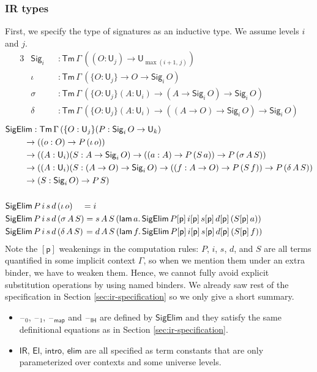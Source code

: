 \documentclass[acmsmall,screen,review,anonymous]{acmart}
\newcommand{\msf}[1]{{\mathsf{#1}}}
\newcommand{\p}{\mathsf{p}}
\newcommand{\U}{\msf{U}}
\newcommand{\El}{\msf{El}}
\newcommand{\Sig}{\msf{Sig}}
\newcommand{\blank}{{\mathord{\hspace{1pt}\text{--}\hspace{1pt}}}}
\newcommand{\IR}{\msf{IR}}
\newcommand{\intro}{\msf{intro}}
\newcommand{\IH}{\msf{IH}}
\newcommand{\map}{\msf{map}}
\newcommand{\elim}{\msf{elim}}
\newcommand{\Tm}{\msf{Tm}}
\newcommand{\lam}{\msf{lam}}
\newcommand{\SigElim}{\msf{SigElim}}
\begin{document}
\subsubsection{IR types} First, we specify the type of signatures as an inductive type. We assume levels $i$
and $j$.
\begin{alignat*}{3}
  &\Sig_i  &&: \Tm\,\Gamma\,((O : \U_j) \to \U_{\max(i+1,\,j)})\\
  &\iota   &&: \Tm\,\Gamma\,(\{O : \U_j\} \to O \to \Sig_i\,O)\\
  &\sigma  &&: \Tm\,\Gamma\,(\{O : \U_j\}(A : \U_i) \to (A \to \Sig_i\,O) \to \Sig_i\,O)\\
  &\delta  &&: \Tm\,\Gamma\,(\{O : \U_j\}(A : \U_i) \to ((A \to O) \to \Sig_i\,O) \to \Sig_i\,O)
\end{alignat*}
\begin{alignat*}{3}
  &\SigElim : \Tm\,\Gamma\,(\{O : \U_j\}(P : \Sig_i\,O \to \U_k)\\
  &           \hspace{2.2em}\to ((o : O) \to P\,(\iota\,o))\\
  &           \hspace{2.2em}\to ((A : \U_i)(S : A \to \Sig_i\,O) \to ((a : A) \to P\,(S\,a)) \to P\,(\sigma\,A\,S))\\
  &           \hspace{2.2em}\to ((A : \U_i)(S : (A \to O) \to \Sig_i\,O) \to ((f : A \to O) \to P\,(S\,f)) \to P\,(\delta\,A\,S))\\
  &           \hspace{2.2em}\to (S : \Sig_i\,O) \to P\,S)\\
  &\\
  &\SigElim\,P\,i\,s\,d\,(\iota\,o) \hspace{1.1em} = i\\
  &\SigElim\,P\,i\,s\,d\,(\sigma\,A\,S) = s\,A\,S\,(\lam\,a.\,\SigElim\,P[\p]\,i[\p]\,s[\p]\,d[\p]\,(S[\p]\,a))\\
  &\SigElim\,P\,i\,s\,d\,(\delta\,A\,S) \hspace{0.1em}= d\,A\,S\,(\lam\,f.\,\SigElim\,P[\p]\,i[\p]\,s[\p]\,d[\p]\,(S[\p]\,f))
\end{alignat*}
Note the $[\p]$ weakenings in the computation rules: $P$, $i$, $s$, $d$, and $S$ are all terms
quantified in some implicit context $\Gamma$, so when we mention them under an extra binder, we have
to weaken them. Hence, we cannot fully avoid explicit substitution operations by using named
binders. We already saw rest of the specification in Section \ref{sec:ir-specification} so we only give a short
summary.
\begin{itemize}
\item $\blank_0$, $\blank_1$, $\blank_\map$ and $\blank_\IH$ are defined by $\SigElim$ and they satisfy the same definitional equations
  as in Section \ref{sec:ir-specification}.
\item $\IR$, $\El$, $\intro$, $\elim$ are all specified as term constants that are only parameterized over contexts and some universe levels.
\end{itemize}
\end{document}

